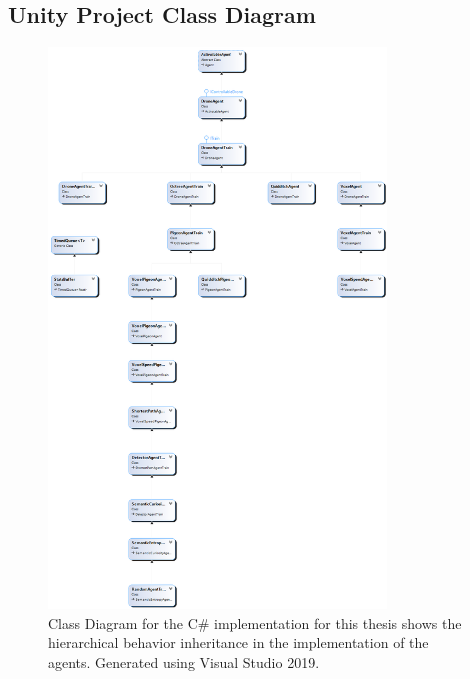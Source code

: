 \newpage

\subsection{Unity Project Class Diagram}


\begin{figure}[!ht]
    \centering
    \includegraphics[width=0.8\textwidth]{images/ClassDiagram2.png}
    \caption{Class Diagram for the C\# implementation for this thesis shows the hierarchical behavior inheritance in the implementation of the agents. Generated using Visual Studio 2019.}
    \label{fig:classdiagram}
\end{figure}


\newpage


